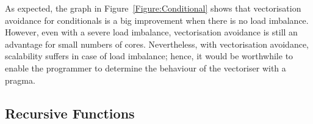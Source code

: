 As expected, the graph in Figure~\ref{Figure:Conditional} shows that vectorisation avoidance for conditionals is a big improvement when there is no load imbalance. However, even with a severe load imbalance, vectorisation avoidance is still an advantage for small numbers of cores. Nevertheless, with vectorisation avoidance, scalability suffers in case of load imbalance; hence, it would be worthwhile to enable the programmer to determine the behaviour of the vectoriser with a pragma.


\subsection{Recursive Functions}

